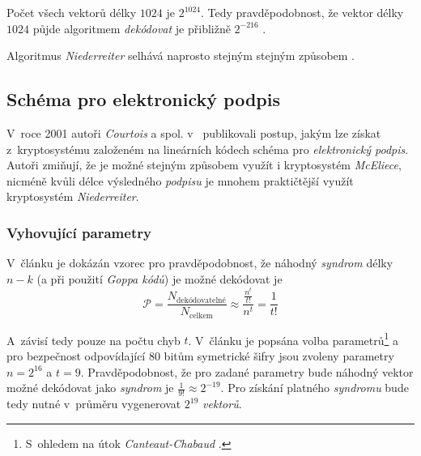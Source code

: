 \documentclass[thesis=M,czech,hidelinks]{FITthesis}[2012/06/26]
\newcommand{\0}{{\textcolor[gray]{0.80}{0}}}
\begin{document}
Počet všech vektorů délky $1024$ je $2^{1024}$. Tedy pravděpodobnost, že vektor
délky $1024$ půjde algoritmem \emph{dekódovat} je přibližně $2^{-216}$
\cite{McEliece}.

Algoritmus \emph{Niederreiter} selhává naprosto stejným stejným způsobem
\cite{Courtois}.

\subsection{Schéma pro elektronický podpis}\label{kap_schema_pro_podpis}

V~roce 2001 autoři \emph{Courtois} a spol. v~\cite{Courtois} publikovali postup,
jakým lze získat z~kryptosystému založeném na lineárních kódech schéma pro
\emph{elektronický podpis}. Autoři zmiňují, že je možné stejným způsobem využít
i kryptosystém \emph{McEliece}, nicméně kvůli délce výsledného \emph{podpisu} je
mnohem praktičtější využít kryptosystém \emph{Niederreiter}.

\subsubsection{Vyhovující parametry}

V~článku je dokázán vzorec pro pravděpodobnost, že náhodný \emph{syndrom} délky
$n-k$ (a při použití \emph{Goppa kódů}) je možné dekódovat je
$$
    \mathcal{P} = \frac{N_{\text{dekódovatelné}}}{N_{\text{celkem}}} \approx
    \frac{\frac{n^t}{t!}}{n^t} = \frac{1}{t!}
$$


A~závisí tedy pouze na počtu chyb $t$. V~článku je popsána volba
parametrů\footnote{
    S~ohledem na útok \emph{Canteaut-Chabaud} \cite{Canteaut}.
} a pro bezpečnost odpovídající $80$ bitům symetrické šifry jsou zvoleny
parametry $n=2^{16}$ a $t=9$.  Pravděpodobnost, že pro zadané parametry bude
náhodný vektor možné dekódovat jako \emph{syndrom} je $\frac{1}{9!} \approx
2^{-19}$. Pro získání platného \emph{syndromu} bude tedy nutné v~průměru
vygenerovat $2^{19}$ \emph{vektorů}.
\end{document}

